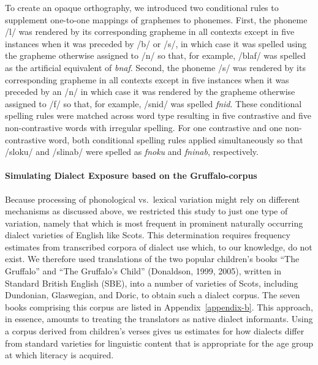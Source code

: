 \documentclass[doc,floatsintext]{apa6}
\let\oldparagraph\paragraph
\renewcommand{\paragraph}[1]{\oldparagraph{#1}\mbox{}}
\begin{document}
To create an opaque orthography, we introduced two conditional rules to
supplement one-to-one mappings of graphemes to phonemes. First, the
phoneme /l/ was rendered by its corresponding grapheme in all contexts
except in five instances when it was preceded by /b/ or /s/, in which
case it was spelled using the grapheme otherwise assigned to /n/ so
that, for example, /blaf/ was spelled as the artificial equivalent of
\emph{bnaf}. Second, the phoneme /s/ was rendered by its corresponding
grapheme in all contexts except in five instances when it was preceded
by an /n/ in which case it was rendered by the grapheme otherwise
assigned to /f/ so that, for example, /snid/ was spelled \emph{fnid}.
These conditional spelling rules were matched across word type resulting
in five contrastive and five non-contrastive words with irregular
spelling. For one contrastive and one non-contrastive word, both
conditional spelling rules applied simultaneously so that /sloku/ and
/slinab/ were spelled as \emph{fnoku} and \emph{fninab}, respectively.

\paragraph{Simulating Dialect Exposure based on the
Gruffalo-corpus}\label{simulating-dialect-exposure-based-on-the-gruffalo-corpus}

Because processing of phonological vs.~lexical variation might rely on
different mechanisms as discussed above, we restricted this study to
just one type of variation, namely that which is most frequent in
prominent naturally occurring dialect varieties of English like Scots.
This determination requires frequency estimates from transcribed corpora
of dialect use which, to our knowledge, do not exist. We therefore used
translations of the two popular children's books \enquote{The Gruffalo}
and \enquote{The Gruffalo's Child} (Donaldson, 1999, 2005), written in
Standard British English (SBE), into a number of varieties of Scots,
including Dundonian, Glaswegian, and Doric, to obtain such a dialect
corpus. The seven books comprising this corpus are listed in
Appendix~\ref{appendix-b}. This approach, in essence, amounts to
treating the translators as native dialect informants. Using a corpus
derived from children's verses gives us estimates for how dialects
differ from standard varieties for linguistic content that is
appropriate for the age group at which literacy is acquired.
\end{document}
